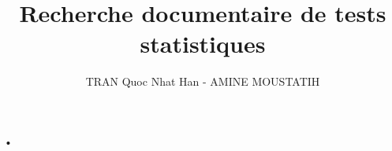 \documentclass[12pt,a4paper]{article}
\author{TRAN Quoc Nhat Han - AMINE MOUSTATIH}
\title{Recherche documentaire de tests statistiques}
\begin{document}
•
\end{document}
